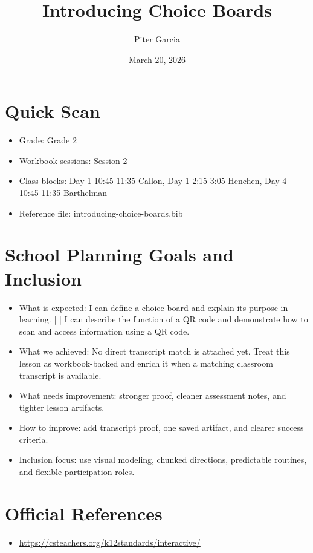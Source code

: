 \documentclass[11pt]{article}
\title{Introducing Choice Boards}
\author{Piter Garcia}
\date{March 20, 2026}
\begin{document}
\maketitle
\section*{Quick Scan}
\begin{itemize}[leftmargin=*]
\item Grade: Grade 2
\item Workbook sessions: Session 2
\item Class blocks: Day 1 10:45-11:35 Callon, Day 1 2:15-3:05 Henchen, Day 4 10:45-11:35 Barthelman
\item Reference file: introducing-choice-boards.bib
\end{itemize}
\section*{School Planning Goals and Inclusion}
\begin{itemize}[leftmargin=*]
\item What is expected: I can define a choice board and explain its purpose in learning. | | I can describe the function of a QR code and demonstrate how to scan and access information using a QR code.
\item What we achieved: No direct transcript match is attached yet. Treat this lesson as workbook-backed and enrich it when a matching classroom transcript is available.
\item What needs improvement: stronger proof, cleaner assessment notes, and tighter lesson artifacts.
\item How to improve: add transcript proof, one saved artifact, and clearer success criteria.
\item Inclusion focus: use visual modeling, chunked directions, predictable routines, and flexible participation roles.
\end{itemize}
\section*{Official References}
\begin{itemize}[leftmargin=*]
\item \url{https://csteachers.org/k12standards/interactive/}

\end{itemize}
\end{document}
